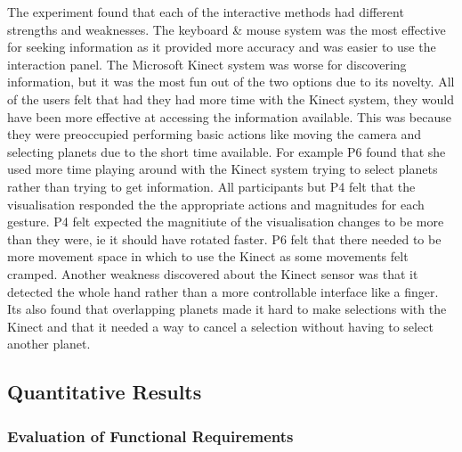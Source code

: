 \begin{enumerate}
The experiment found that each of the interactive methods had different
strengths and weaknesses. The keyboard \& mouse system was the most effective
for seeking information as it provided more accuracy and was easier to use the
interaction panel. The Microsoft Kinect system was worse for discovering
information, but it was the most fun out of the two options due to its novelty.
All of the users felt that had they had more time with the Kinect system, they
would have been more effective at accessing the information available. This was
because they were preoccupied performing basic actions like moving the camera
and selecting planets due to the short time available. For example P6 found that
she used more time playing around with the Kinect system trying to select
planets rather than trying to get information. All participants but P4 felt that
the visualisation responded the the appropriate actions and magnitudes for each
gesture. P4 felt expected the magnitiute of the visualisation changes to be more
than they were, ie it should have rotated faster. P6 felt that there needed to
be more movement space in which to use the Kinect as some movements felt
cramped. Another weakness discovered about the Kinect sensor was that it
detected the whole hand rather than a more controllable interface like a finger.
Its also found that overlapping planets made it hard to make selections with the
Kinect and that it needed a way to cancel a selection without having to select
another planet.

\end{enumerate}

\subsection{Quantitative Results}
\subsubsection{Evaluation of Functional Requirements}

